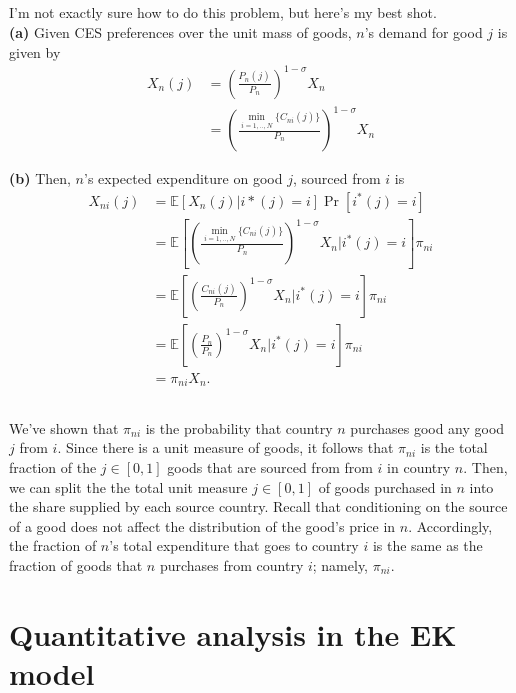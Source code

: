 \documentclass[12pt]{article}
\newcommand{\E}{\mathbb{E}}
\begin{document}
\subsection{}
I'm not exactly sure how to do this problem, but here's my best shot.\\

\textbf{(a)} Given CES preferences over the unit mass of goods, $n$'s demand for good $j$ is given by
\begin{align*}
X_n(j) &= \left(\frac{P_n(j)}{P_n}\right)^{1-\sigma}X_n\\
&=  \left(\frac{\min_{i=1,..,N}\{C_{ni}(j)\}}{P_n}\right)^{1-\sigma}X_n
\end{align*}

\textbf{(b)} Then, $n$'s expected expenditure on good $j$, sourced from $i$ is
\begin{align*}
X_{ni}(j) &= \E[X_n(j)  | i*(j) = i] \Pr[i^*(j) = i]\\
&=\E \left[\left(\frac{\min_{i=1,..,N}\{C_{ni}(j)\}}{P_n}\right)^{1-\sigma}X_n|  i^*(j) = i\right] \pi_{ni}\\
&= \E \left[\left(\frac{C_{ni}(j)}{P_n}\right)^{1-\sigma}X_n|  i^*(j) = i\right] \pi_{ni}\\
&= \E \left[\left(\frac{P_n}{P_n}\right)^{1-\sigma}X_n|  i^*(j) = i\right] \pi_{ni}\\
&= \pi_{ni} X_n.
\end{align*}




\subsection{} We've shown that $\pi_{ni}$ is the probability that country $n$ purchases good any good $j$ from $i$. Since there is a unit measure of goods, it follows that $\pi_{ni}$ is the total fraction of the $j \in [0,1]$ goods that are sourced from from $i$ in country $n$. Then, we can split the the total unit measure $j\in [0,1]$ of goods purchased in $n$ into the share supplied by each source country. Recall that conditioning on the source of a good does not affect the distribution of the good's price in $n$. Accordingly, the fraction of $n$'s total expenditure that goes to country $i$ is the same as the fraction of goods that $n$ purchases from country $i$; namely, $\pi_{ni}$.


\section{Quantitative analysis in the EK model}
\end{document}
